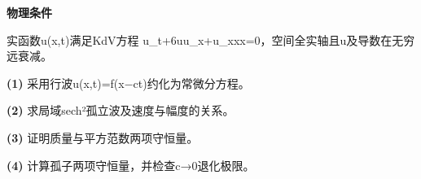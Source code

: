 \textbf{物理条件}\par 实函数u(x,t)满足KdV方程 u\_t+6uu\_x+u\_xxx=0，空间全实轴且u及导数在无穷远衰减。
\par\noindent\textbf{(1)} 采用行波u(x,t)=f(x−ct)约化为常微分方程。
\par\noindent\textbf{(2)} 求局域sech²孤立波及速度与幅度的关系。
\par\noindent\textbf{(3)} 证明质量与平方范数两项守恒量。
\par\noindent\textbf{(4)} 计算孤子两项守恒量，并检查c→0退化极限。

